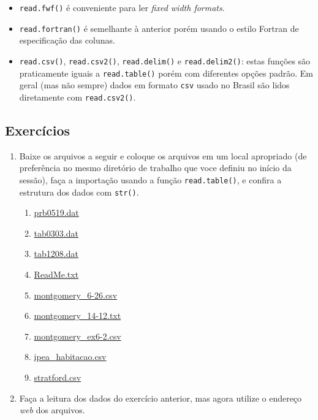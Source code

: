 \documentclass[10pt,a4paper]{book}
\providecommand{\tightlist}{%
  \setlength{\itemsep}{0pt}\setlength{\parskip}{0pt}}
\begin{document}
\begin{itemize}
\tightlist
\item
  \texttt{read.fwf()} é conveniente para ler \emph{fixed width formats}.
\item
  \texttt{read.fortran()} é semelhante à anterior porém usando o estilo
  Fortran de especificação das colunas.
\item
  \texttt{read.csv()}, \texttt{read.csv2()}, \texttt{read.delim()} e
  \texttt{read.delim2()}: estas funções são praticamente iguais a
  \texttt{read.table()} porém com diferentes opções padrão. Em geral
  (mas não sempre) dados em formato \texttt{csv} usado no Brasil são
  lidos diretamente com \texttt{read.csv2()}.
\end{itemize}

\subsection*{Exercícios}\label{exercuxedcios-10}


\begin{enumerate}
\def\labelenumi{\arabic{enumi}.}
\tightlist
\item
  Baixe os arquivos a seguir e coloque os arquivos em um local
  apropriado (de preferência no mesmo diretório de trabalho que voce
  definiu no início da sessão), faça a importação usando a função
  \texttt{read.table()}, e confira a estrutura dos dados com
  \texttt{str()}.

  \begin{enumerate}
  \def\labelenumii{\alph{enumii}.}
  \tightlist
  \item
    \href{http://leg.ufpr.br/~fernandomayer/data/BHH2/prb0519.dat}{prb0519.dat}
  \item
    \href{http://leg.ufpr.br/~fernandomayer/data/BHH2/tab0303.dat}{tab0303.dat}
  \item
    \href{http://leg.ufpr.br/~fernandomayer/data/BHH2/tab1208.dat}{tab1208.dat}
  \item
    \href{http://leg.ufpr.br/~fernandomayer/data/BHH2/ReadMe.txt}{ReadMe.txt}
  \item
    \href{http://leg.ufpr.br/~fernandomayer/data/montgomery_6-26.csv}{montgomery\_6-26.csv}
  \item
    \href{http://leg.ufpr.br/~fernandomayer/data/montgomery_14-12.txt}{montgomery\_14-12.txt}
  \item
    \href{http://leg.ufpr.br/~fernandomayer/data/montgomery_ex6-2.csv}{montgomery\_ex6-2.csv}
  \item
    \href{http://www.leg.ufpr.br/~fernandomayer/data/ipea_habitacao.csv}{ipea\_habitacao.csv}
  \item
    \href{http://www.leg.ufpr.br/~fernandomayer/data/stratford.csv}{stratford.csv}
  \end{enumerate}
\item
  Faça a leitura dos dados do exercício anterior, mas agora utilize o
  endereço \emph{web} dos arquivos.
\end{enumerate}
\end{document}
